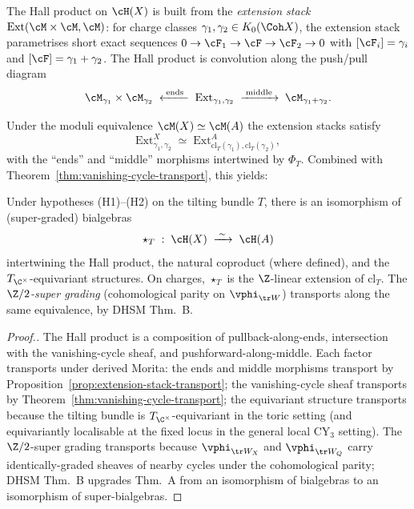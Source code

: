 The Hall product on $\cH(X)$ is built from the \emph{extension stack}
$\mathrm{Ext}(\cM \times \cM, \cM)$: for charge classes
$\gamma_1, \gamma_2 \in K_0(\Coh X)$, the extension stack parametrises short
exact sequences $0 \to \cF_1 \to \cF \to \cF_2 \to 0$ with
$[\cF_i] = \gamma_i$ and $[\cF] = \gamma_1 + \gamma_2$. The Hall product is
convolution along the push/pull diagram
\[
 \cM_{\gamma_1} \times \cM_{\gamma_2}
 \;\xleftarrow{\;\mathrm{ends}\;}\;
 \mathrm{Ext}_{\gamma_1, \gamma_2}
 \;\xrightarrow{\;\mathrm{middle}\;}\;
 \cM_{\gamma_1 + \gamma_2}.
\]

\begin{proposition}
\label{prop:extension-stack-transport}
Under the moduli equivalence
$\cM(X) \simeq \cM(A)$ the extension stacks satisfy
\[
 \mathrm{Ext}_{\gamma_1, \gamma_2}^{X} \;\simeq\;
 \mathrm{Ext}_{\mathrm{cl}_T(\gamma_1), \mathrm{cl}_T(\gamma_2)}^{A},
\]
with the ``ends'' and ``middle'' morphisms intertwined by $\Phi_T$. Combined
with Theorem~\ref{thm:vanishing-cycle-transport}, this yields:
\end{proposition}

\begin{theorem}
\label{thm:hall-product-transport}
Under hypotheses (H1)--(H2) on the tilting bundle $T$,
there is an isomorphism of (super-graded) bialgebras
\[
 \star_T \;:\; \cH(X) \;\xrightarrow{\;\sim\;}\; \cH(A)
\]
intertwining the Hall product, the natural coproduct (where defined), and the
$T_{\C^\times}$-equivariant structures. On charges, $\star_T$ is the
$\Z$-linear extension of $\mathrm{cl}_T$. The \emph{$\Z/2$-super grading}
(cohomological parity on $\vphi_{\tr W}$) transports along the same
equivalence, by DHSM Thm.~B.
\end{theorem}

\begin{proof}[Proof.]
The Hall product is a composition of pullback-along-ends, intersection with
the vanishing-cycle sheaf, and pushforward-along-middle. Each factor transports
under derived Morita: the ends and middle morphisms transport by
Proposition~\ref{prop:extension-stack-transport}; the vanishing-cycle sheaf
transports by Theorem~\ref{thm:vanishing-cycle-transport}; the equivariant
structure transports because the tilting bundle is $T_{\C^\times}$-equivariant
in the toric setting (and equivariantly localisable at the fixed locus in the
general local CY$_3$ setting). The $\Z/2$-super grading transports because
$\vphi_{\tr W_X}$ and $\vphi_{\tr W_Q}$ carry identically-graded sheaves of
nearby cycles under the cohomological parity; DHSM Thm.~B upgrades Thm.~A from
an isomorphism of bialgebras to an isomorphism of super-bialgebras.
\end{proof}

